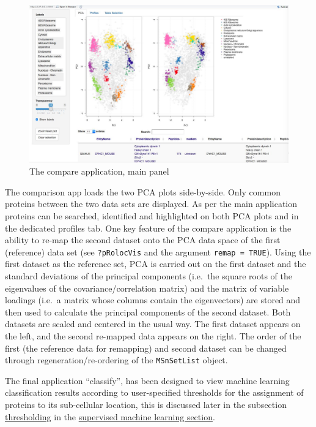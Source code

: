 \begin{figure}[htbp]
\centering
\includegraphics{./Figures/SS_Compare1.jpg}
\caption{The compare application, main panel}
\end{figure}

The comparison app loads the two PCA plots side-by-side. Only common
proteins between the two data sets are displayed. As per the main
application proteins can be searched, identified and highlighted on both
PCA plots and in the dedicated profiles tab. One key feature of the
compare application is the ability to re-map the second dataset onto the
PCA data space of the first (reference) data set (see
\texttt{?pRolocVis} and the argument \texttt{remap = TRUE}). Using the
first dataset as the reference set, PCA is carried out on the first
dataset and the standard deviations of the principal components
(i.e.~the square roots of the eigenvalues of the covariance/correlation
matrix) and the matrix of variable loadings (i.e.~a matrix whose columns
contain the eigenvectors) are stored and then used to calculate the
principal components of the second dataset. Both datasets are scaled and
centered in the usual way. The first dataset appears on the left, and
the second re-mapped data appears on the right. The order of the first
(the reference data for remapping) and second dataset can be changed
through regeneration/re-ordering of the \texttt{MSnSetList} object.

The final application ``classify'', has been designed to view machine
learning classification results according to user-specified thresholds
for the assignment of proteins to its sub-cellular location, this is
discussed later in the subsection \hyperref[thresholding]{thresholding}
in the \hyperref[supervised-machine-learning]{supervised machine
learning section}.

